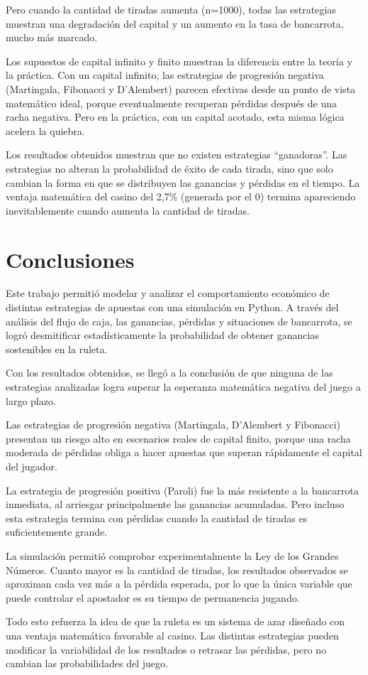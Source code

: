\documentclass{article}
\begin{document}
Pero cuando la cantidad de tiradas aumenta (n=1000), todas las estrategias muestran una degradación del capital y un aumento en la tasa de bancarrota, mucho más marcado.

Los supuestos de capital infinito y finito muestran la diferencia entre la teoría y la práctica. Con un capital infinito, las estrategias de progresión negativa (Martingala, Fibonacci y D’Alembert) parecen efectivas desde un punto de vista matemático ideal, porque eventualmente recuperan pérdidas después de una racha negativa. Pero en la práctica, con un capital acotado, esta misma lógica acelera la quiebra.

Los resultados obtenidos muestran que no existen estrategias “ganadoras”. Las estrategias no alteran la probabilidad de éxito de cada tirada, sino que solo cambian la forma en que se distribuyen las ganancias y pérdidas en el tiempo. La ventaja matemática del casino del 2,7\% (generada por el 0) termina apareciendo inevitablemente cuando aumenta la cantidad de tiradas.


\section{Conclusiones}
Este trabajo permitió modelar y analizar el comportamiento económico de distintas estrategias de apuestas con una simulación en Python. A través del análisis del flujo de caja, las ganancias, pérdidas y situaciones de bancarrota, se logró desmitificar estadísticamente la probabilidad de obtener ganancias sostenibles en la ruleta.

Con los resultados obtenidos, se llegó a la conclusión de que ninguna de las estrategias analizadas logra superar la esperanza matemática negativa del juego a largo plazo.

Las estrategias de progresión negativa (Martingala, D’Alembert y Fibonacci) presentan un riesgo alto en escenarios reales de capital finito, porque una racha moderada de pérdidas obliga a hacer apuestas que superan rápidamente el capital del jugador.

La estrategia de progresión positiva (Paroli) fue la más resistente a la bancarrota inmediata, al arriesgar principalmente las ganancias acumuladas. Pero incluso esta estrategia termina con pérdidas cuando la cantidad de tiradas es suficientemente grande.

La simulación permitió comprobar experimentalmente la Ley de los Grandes Números. Cuanto mayor es la cantidad de tiradas, los resultados observados se aproximan cada vez más a la pérdida esperada, por lo que la única variable que puede controlar el apostador es su tiempo de permanencia jugando.

Todo esto refuerza la idea de que la ruleta es un sistema de azar diseñado con una ventaja matemática favorable al casino. Las distintas estrategias pueden modificar la variabilidad de los resultados o retrasar las pérdidas, pero no cambian las probabilidades del juego.


\nocite{*}



\end{document}
